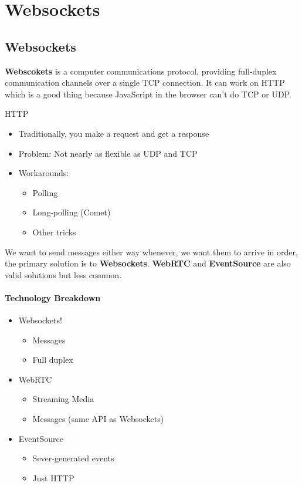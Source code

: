 \documentclass[../CMPUT-404-Notes.tex]{subfiles}
\begin{document}
\chapter{Websockets}
\section{Websockets}
\textbf{Webscokets} is a computer communications protocol, providing full-duplex communication channels over a single TCP connection. It can work on HTTP which is a good thing because JavaScript in the browser can't do TCP or UDP. 

\begin{DndSidebar}[color=PhbLightGreen]{HTTP}
    \begin{itemize}
        \item Traditionally, you make a request and get a response 
        \item Problem: Not nearly as flexible as UDP and TCP
        \item Workarounds:
        \begin{itemize}
            \item Polling
            \item Long-polling (Comet)
            \item Other tricks
        \end{itemize}
    \end{itemize}
\end{DndSidebar}

We want to send messages either way whenever, we want them to arrive in order, the primary solution is to \textbf{Websockets}. \textbf{WebRTC} and \textbf{EventSource} are also valid solutions but less common. 


\subsubsection{Technology Breakdown}
\begin{itemize}
    \item Websockets!
    \begin{itemize}
        \item Messages
        \item Full duplex
    \end{itemize}
    \item WebRTC
    \begin{itemize}
        \item Streaming Media
        \item Messages (same API as Websockets)
    \end{itemize}
    \item EventSource
    \begin{itemize}
        \item Sever-generated events
        \item Just HTTP
    \end{itemize}
\end{itemize}
\end{document}
